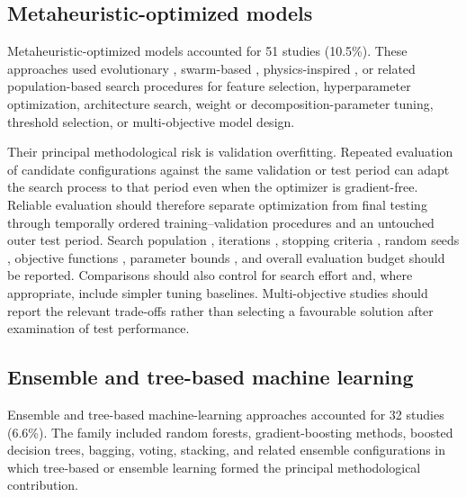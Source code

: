 \documentclass[12pt]{article}
\numberwithin{equation}{section}
\begin{document}
\subsection{Metaheuristic-optimized models}
\label{sec:supp-metaheuristics}

Metaheuristic-optimized models accounted for 51 studies (10.5\%). These
approaches used evolutionary \cite{P00923,P00962,P01021,P01055,P01089,P01214}, swarm-based \cite{P01687,P01785,P02381,P02464,P02563,P02976}, physics-inspired \cite{P03101,P03518,P03885,P03886,P03936,P04110,P04194}, or related
population-based search procedures for feature selection, hyperparameter
optimization, architecture search, weight or decomposition-parameter tuning,
threshold selection, or multi-objective model design.

Their principal methodological risk is validation overfitting. Repeated
evaluation of candidate configurations against the same validation or test
period can adapt the search process to that period even when the optimizer
is gradient-free. Reliable evaluation should therefore separate optimization
from final testing through temporally ordered training--validation procedures
and an untouched outer test period. Search population \cite{P00035,P00049,P00061,P00129,P00163}, iterations \cite{P00196,P00216,P00259,P00274,P00285,P00312,P00345}, stopping
criteria \cite{P00355,P00362,P00369,P00392}, random seeds \cite{P00536,P00540,P00562,P00563}, objective functions \cite{P00592,P00595,P00610,P00614}, parameter bounds \cite{P00617,P00638,P00655,P00660,P00701}, and overall
evaluation budget \cite{P00774,P00810,P00830,P00857,P00865,P00886,P00920} should be reported. Comparisons should also control for
search effort and, where appropriate, include simpler tuning baselines.
Multi-objective studies should report the relevant trade-offs rather than
selecting a favourable solution after examination of test performance.

\subsection{Ensemble and tree-based machine learning}
\label{sec:supp-ensemble}

Ensemble \cite{P00401,P00509,P00551,P00600,P00608,P00651,P00654,P00688,P00690,P00698,P00734,P00744,P01034,P01167,P01208,P01249,P01269,P01324} and tree-based \cite{P00019,P00057,P00071,P00080,P00083,P00120,P00121,P00154,P00183,P00190,P00260,P00400,P00898,P00911,P00955,P00983,P00988,P01008} machine-learning approaches accounted for 32 studies
(6.6\%). The family included random forests, gradient-boosting methods,
boosted decision trees, bagging, voting, stacking, and related ensemble
configurations in which tree-based or ensemble learning formed the principal
methodological contribution.
\end{document}
